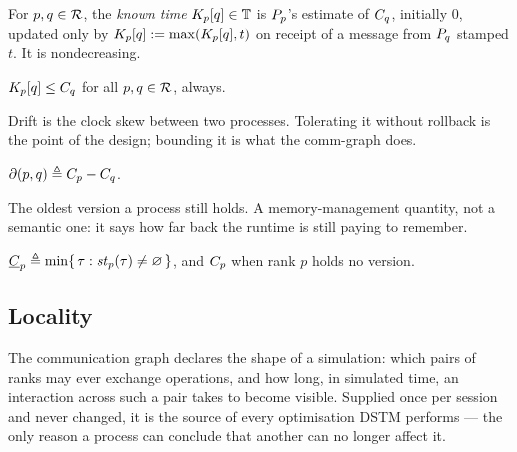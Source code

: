 \begin{definition}\label{def:known-time}
For $p, q \in \mathcal{R}$, the \emph{known time} $K_{p}[q] \in \mathbb{T}$ is
$P_{p}$'s estimate of $C_{q}$, initially $0$, updated only by
$K_{p}[q] \mathrel{{:}{=}} \max(K_{p}[q], t)$ on receipt of a message from
$P_{q}$ stamped $t$. It is nondecreasing.
\end{definition}

\begin{invariant}\label{inv:clock-soundness}
$K_{p}[q] \le C_{q}$ for all $p, q \in \mathcal{R}$, always.
\end{invariant}

Drift is the clock skew between two processes. Tolerating it without rollback
is the point of the design; bounding it is what the \gls{comm-graph} does.

\begin{definition}[Drift]\label{def:drift}
$\partial(p,q) \triangleq C_{p} - C_{q}$.
\end{definition}

The oldest version a process still holds. A memory-management quantity, not a
semantic one: it says how far back the runtime is still paying to remember.

\begin{definition}\label{def:mvt}
$\underline{C}_{p} \triangleq \min \{\, \tau : \mathit{st}_{p}(\tau) \ne \varnothing \,\}$, and
$C_{p}$ when rank $p$ holds no version.
\end{definition}

\subsection{Locality}
\label{sec:gloss-locality}

The communication graph declares the shape of a simulation: which pairs of
ranks may ever exchange \glspl{operation}, and how long, in simulated time, an
interaction across such a pair takes to become visible. Supplied once per
\gls{session} and never changed, it is the source of every optimisation DSTM
performs --- the only reason a process can conclude that another can no longer
affect it.


